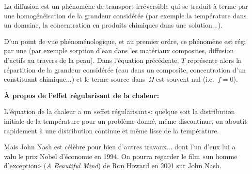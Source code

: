 La diffusion est un phénomène de transport irréversible qui se traduit à terme par une homogénéisation de la grandeur considérée (par exemple la température dans un domaine, la concentration en produits chimiques dans une solution...).

D'un point de vue phénoménologique, et au premier ordre, ce phénomène est régi par une  (par exemple sorption d'eau dans les matériaux composites, diffusion d'actifs au travers de la peau). Dans l'équation précédente, $T$ représente alors la répartition de la grandeur considérée (eau dans un composite, concentration d'un constituant chimique...) et le terme source dans~$\Omega$ est souvent nul (i.e.~$f=0$).

\begin{histoire}%
\textbf{À propos de l'effet régularisant de la chaleur:}

L'équation de la chaleur a un «effet régularisant»: quelque soit la distribution initiale de la température pour un problème donné, même discontinue, on aboutit rapidement à une distribution continue et même lisse de la température.

\medskip
{}
Mais John Nash est célèbre pour bien d'autres travaux... dont l'un d'eux lui a valu le prix Nobel d'économie en 1994. On pourra regarder le film «un homme d'exception» (\emph{A Beautiful Mind}) de Ron Howard en 2001 sur John Nash.
\end{histoire}



